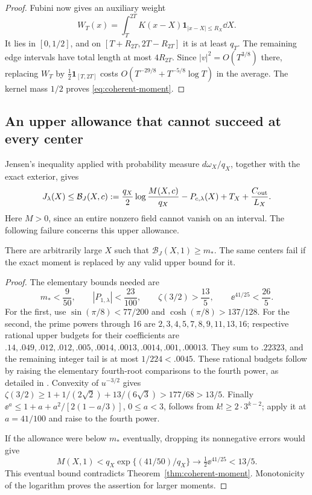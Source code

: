 \begin{proof}
Fubini now gives an auxiliary weight
\[
 W_T(x)=\int_T^{2T}K(x-X)\mathbf1_{|x-X|\le R_X}\dd X.
\]
It lies in \([0,1/2]\), and on
\([T+R_{2T},2T-R_{2T}]\) it is at least \(q_T\).
The remaining edge intervals have total length at most \(4R_{2T}\).
Since \(|v|^2=O(T^{3/8})\) there, replacing \(W_T\) by
\(\tfrac12\mathbf1_{[T,2T]}\) costs
\(O(T^{-29/8}+T^{-5/8}\log T)\) in the average.
The kernel mass \(1/2\) proves \eqref{eq:coherent-moment}.
\end{proof}

\subsection{An upper allowance that cannot succeed at every center}
Jensen's inequality applied with probability measure
\(d\omega_X/q_X\), together with the exact exterior, gives
\begin{equation}\label{eq:quadratic-allowance}
 J_\lambda(X)\le\mathcal B_J(X,c):=
 \frac{q_X}{2}\log\frac{M(X,c)}{q_X}
      -P_{c,\lambda}(X)+T_X+\frac{C_{\rm out}}{L_X}.
\end{equation}
Here \(M>0\), since an entire nonzero field cannot vanish on an
interval. The following failure concerns this upper allowance.

\begin{corollary}\label{cor:Jensen-stop}
There are arbitrarily large \(X\) such that
\(\mathcal B_J(X,1)\ge m_*\). The same centers fail if the exact
moment is replaced by any valid upper bound for it.
\end{corollary}
\begin{proof}
The elementary bounds needed are
\[
 m_*<\frac9{50},\qquad |P_{1,\lambda}|<\frac{23}{100},\qquad
 \zeta(3/2)>\frac{13}{5},\qquad \ee^{41/25}<\frac{26}{5}.
\]
For the first, use \(\sin(\pi/8)<77/200\) and
\(\cosh(\pi/8)>137/128\). For the second, the prime powers through
16 are \(2,3,4,5,7,8,9,11,13,16\); respective rational upper
budgets for their coefficients are
\(.14,.049,.012,.012,.005,.0014,.0013,.0014,.001,.00013\).
They sum to \(.22323\), and the remaining integer tail is at most
\(1/224<.0045\). These rational budgets follow by raising the
elementary fourth-root comparisons to the fourth power, as detailed
in \cite{GNPRSMoment}. Convexity of \(u^{-3/2}\) gives
\(\zeta(3/2)\ge1+1/(2\sqrt2)+13/(6\sqrt3)>177/68>13/5\).
Finally \(\ee^a\le1+a+a^2/[2(1-a/3)]\), \(0\le a<3\), follows
from \(k!\ge2\cdot3^{k-2}\); apply it at \(a=41/100\) and
raise to the fourth power.

If the allowance were below \(m_*\) eventually, dropping its
nonnegative errors would give
\[
 M(X,1)<q_X\exp\{(41/50)/q_X\}\longrightarrow
                  \tfrac12\ee^{41/25}<13/5.
\]
This eventual bound contradicts Theorem~\ref{thm:coherent-moment}.
Monotonicity of the logarithm proves the assertion for larger moments.
\end{proof}

